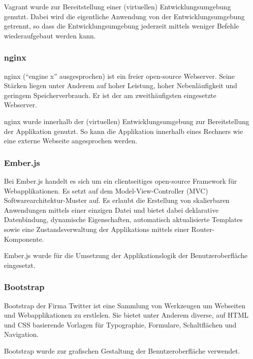 Vagrant wurde zur Bereitstellung einer (virtuellen) Entwicklungsumgebung genutzt. Dabei wird die eigentliche Anwendung von der Entwicklungsumgebung getrennt, so dass die Entwicklungsumgebung jederzeit mittels weniger Befehle wiederaufgebaut werden kann.

\subsubsection{nginx}
\label{ssubsec:komponenten:gui:komponenten:nginx}
nginx (``engine x'' ausgesprochen) ist ein freier open-source Webserver. Seine Stärken liegen unter Anderem  auf hoher Leistung, hoher Nebenläufigkeit und geringem Speicherverbrauch. Er ist der am zweithäufigsten eingesetzte Webserver.~\cite{nginx}

nginx wurde innerhalb der (virtuellen) Entwicklungsumgebung zur Bereitstellung der Applikation genutzt. So kann die Applikation innerhalb eines Rechners wie eine externe Webseite angesprochen werden.

\subsubsection{Ember.js}
\label{ssubsec:komponenten:gui:komponenten:emberjs}
Bei Ember.js handelt es sich um ein clientseitiges open-source Framework für Webapplikationen. Es setzt auf dem Model-View-Controller (MVC) Softwarearchitektur-Muster auf. Es erlaubt die Erstellung von skalierbaren Anwendungen mittels einer einzigen Datei und bietet dabei deklarative Datenbindung, dynamische Eigenschaften, automatisch aktualisierte Templates sowie eine Zustandsverwaltung der Applikations mittels einer Router-Komponente.~\cite{ember}

Ember.js wurde für die Umsetzung der Applikationslogik der Benutzeroberfläche eingesetzt.

\subsubsection{Bootstrap}
\label{ssubsec:komponenten:gui:komponenten:bootstrap}
Bootstrap der Firma Twitter ist eine Sammlung von Werkzeugen um Webseiten und Webapplikationen zu erstlelen. Sie bietet unter Anderem diverse, auf HTML und CSS basierende Vorlagen für Typographie, Formulare, Schaltflächen und Navigation.~\cite{bootstrap}

Bootstrap wurde zur grafischen Gestaltung der Benutzeroberfläche verwendet.

